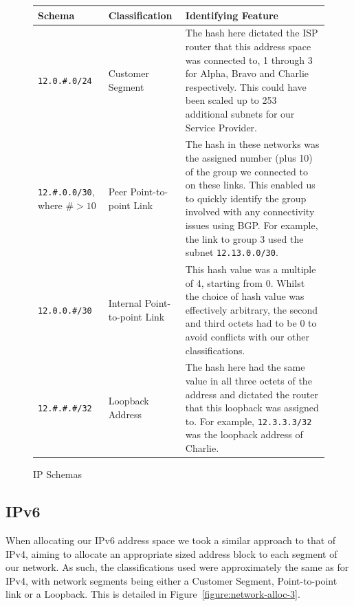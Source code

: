 \begin{figure}[!ht]
    \caption{IP Schemas}
    \label{figure:network-alloc-2}
    \centering
    \begin{tabular}{|p{3cm}|p{3cm}|p{5cm}|}

        \hline
        \textbf{Schema} & \textbf{Classification} & \textbf{Identifying Feature} \\

        \hline
        \texttt{12.0.\#.0/24} & Customer Segment & The hash here dictated the
        ISP router that this address space was connected to, 1 through 3 for
        Alpha, Bravo and Charlie respectively. This could have been scaled up to 253
        additional subnets for our Service Provider.\\
        \hline
        \texttt{12.\#.0.0/30}, where $\#> 10$ & Peer Point-to-point Link &
        The hash in these networks was the assigned number (plus 10) of the group we
        connected to on these links. This enabled us to quickly identify the
        group involved with any connectivity issues using BGP. For example, the
        link to group 3 used the subnet \texttt{12.13.0.0/30}.\\
        \hline
        \texttt{12.0.0.\#/30} & Internal Point-to-point Link &
        This hash value was a multiple of 4, starting from 0. Whilst the choice
        of hash value was effectively arbitrary, the second and third octets had
        to be 0 to avoid conflicts with our other classifications.\\
        \hline
        \texttt{12.\#.\#.\#/32} & Loopback Address & The hash here had
        the same value in all three octets of the address and dictated the
        router that this loopback was assigned to. For example,
        \texttt{12.3.3.3/32} was the loopback address of Charlie.\\

        \hline
    \end{tabular}
\end{figure}

\clearpage

\subsection{IPv6}
When allocating our IPv6 address space we took a similar approach to that of
IPv4, aiming to allocate an appropriate sized address block to each segment of
our network. As such, the classifications used were approximately the same as
for IPv4, with network segments being either a Customer Segment, Point-to-point
link or a Loopback. This is detailed in Figure~\ref{figure:network-alloc-3}.

